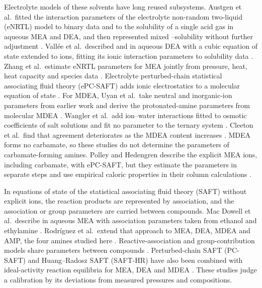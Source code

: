 Electrolyte models of these solvents have long reused subsystems.
Austgen et al.\ fitted the interaction parameters of the electrolyte non-random two-liquid (eNRTL) model to binary data and to the solubility of a single acid gas in aqueous MEA and DEA, and then represented mixed --\COtwo solubility without further adjustment \cite{austgenModelVaporliquidEquilibria1989}.
Vall\'ee et al.\ described \COtwo and  in aqueous DEA with a cubic equation of state extended to ions, fitting its ionic interaction parameters to solubility data \cite{valleeRepresentationCO2H2S1999}.
Zhang et al.\ estimate eNRTL parameters for MEA jointly from pressure, heat, heat capacity and species data \cite{Zhang2011}.
Electrolyte perturbed-chain statistical associating fluid theory (ePC-SAFT) adds ionic electrostatics to a molecular equation of state \cite{Cameretti2005,Held2014}.
For MDEA, Uyan et al.\ take neutral and inorganic-ion parameters from earlier work and derive the protonated-amine parameters from molecular MDEA \cite{Uyan2015}.
Wangler et al.\ add ion--water interactions fitted to osmotic coefficients of salt solutions and fit no parameter to the ternary system \cite{Wangler2018}.
Cleeton et al.\ find that agreement deteriorates as the MDEA content increases \cite{Cleeton2020}.
MDEA forms no carbamate, so these studies do not determine the parameters of carbamate-forming amines.
Polley and Hedengren describe the explicit MEA ions, including carbamate, with ePC-SAFT, but they estimate the parameters in separate steps and use empirical caloric properties in their column calculations \cite{polleyReactiveEPCSAFTModeling2026}.

In equations of state of the statistical associating fluid theory (SAFT) without explicit ions, the reaction products are represented by association, and the association or group parameters are carried between compounds.
Mac Dowell et al.\ describe \COtwo in aqueous MEA with association parameters taken from ethanol and ethylamine \cite{MacDowell2010}.
Rodr\'iguez et al.\ extend that approach to MEA, DEA, MDEA and AMP, the four amines studied here \cite{Rodriguez2012}.
Reactive-association and group-contribution models share parameters between compounds \cite{lloretConsistentTransferableThermodynamic2017,perdomoPredictiveGroupcontributionFramework2023}.
Perturbed-chain SAFT (PC-SAFT) and Huang--Radosz SAFT (SAFT-HR) have also been combined with ideal-activity reaction equilibria for MEA, DEA and MDEA \cite{Baygi2015,Nasrifar2010,Pahlavanzadeh2013,Najafloo2018}.
These studies judge a calibration by its deviations from measured pressures and compositions.

